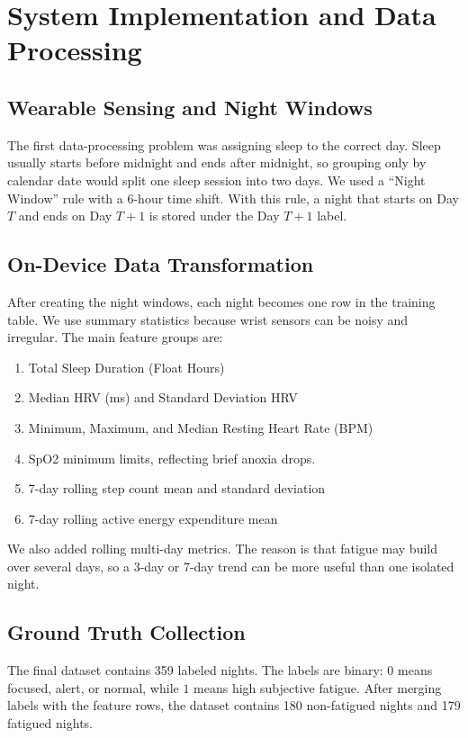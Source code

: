 \documentclass[sigconf,10pt]{acmart}
\begin{document}
\section{System Implementation and Data Processing}

\subsection{Wearable Sensing and Night Windows}
The first data-processing problem was assigning sleep to the correct day. Sleep usually starts before midnight and ends after midnight, so grouping only by calendar date would split one sleep session into two days. We used a ``Night Window'' rule with a 6-hour time shift. With this rule, a night that starts on Day $T$ and ends on Day $T+1$ is stored under the Day $T+1$ label.

\subsection{On-Device Data Transformation}
After creating the night windows, each night becomes one row in the training table. We use summary statistics because wrist sensors can be noisy and irregular. The main feature groups are:
\begin{enumerate}
    \item Total Sleep Duration (Float Hours)
    \item Median HRV (ms) and Standard Deviation HRV
    \item Minimum, Maximum, and Median Resting Heart Rate (BPM)
    \item SpO2 minimum limits, reflecting brief anoxia drops.
    \item 7-day rolling step count mean and standard deviation
    \item 7-day rolling active energy expenditure mean
\end{enumerate}

We also added rolling multi-day metrics. The reason is that fatigue may build over several days, so a 3-day or 7-day trend can be more useful than one isolated night.

\subsection{Ground Truth Collection}
The final dataset contains 359 labeled nights. The labels are binary: $0$ means focused, alert, or normal, while $1$ means high subjective fatigue. After merging labels with the feature rows, the dataset contains 180 non-fatigued nights and 179 fatigued nights.
\end{document}
